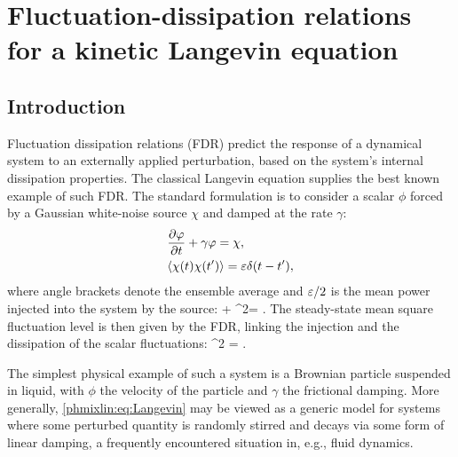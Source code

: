 \chapter{Fluctuation-dissipation relations for a kinetic Langevin equation}
\label{chap:phmixlin}
\section{Introduction}
Fluctuation dissipation relations (FDR) predict the response of a dynamical system to an externally 
applied perturbation, based on the system's internal dissipation properties. The classical Langevin
equation \cite{langevin1908, kubo66} supplies the best known example of such FDR. 
The standard formulation is to consider a scalar $\phi$ 
forced by a Gaussian white-noise source $\chi$ and damped at the rate $\gamma$: 
\begin{align}
&\frac{\partial \varphi}{\partial t} + \gamma \varphi  = \chi, \label{phmixlin:eq:Langevin} \\
&\langle \chi(t) \chi(t') \rangle  = \varepsilon \delta (t-t'), \nonumber
\end{align}
where angle brackets denote the ensemble average and 
$\varepsilon/2$ is the mean power injected into the system by the source:
\beq
{} + \gamma\la\phi^2\ra = .  
\eeq
The steady-state mean square fluctuation level is then given by the FDR, linking 
the injection and the dissipation of the scalar fluctuations:    
\beq
\la \phi^2 \ra = \frac{\eps}{2\gamma}. 
\label{phmixlin:eq:FDR}
\eeq

The simplest physical example of such a system is a Brownian particle suspended 
in liquid, with $\phi$ the velocity of the particle and $\gamma$ the frictional damping.
More generally, \eqref{phmixlin:eq:Langevin} may be viewed as a generic model for 
systems where some perturbed quantity is randomly stirred and decays via 
some form of linear damping, a frequently encountered situation in, e.g., 
fluid dynamics. 

